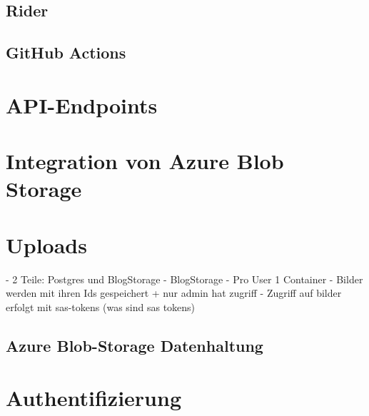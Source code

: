 \subsection{Rider}

\subsection{GitHub Actions}

\section{API-Endpoints}

\section{Integration von Azure Blob Storage}

\section{Uploads}



- 2 Teile: Postgres und BlogStorage
- BlogStorage
    - Pro User 1 Container
    - Bilder werden mit ihren Ids gespeichert + nur admin hat zugriff
    - Zugriff auf bilder erfolgt mit sas-tokens (was sind sas tokens)

\subsection{Azure Blob-Storage Datenhaltung}
\label{subsection:azure_blob_storage_datamodel}

\section{Authentifizierung}
